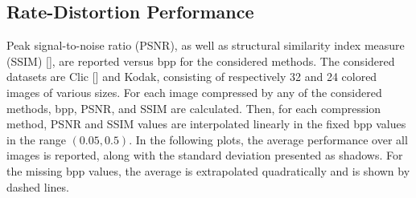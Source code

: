\subsection{Rate-Distortion Performance} \label{sec:rate_distortion_performance}
Peak signal-to-noise ratio (PSNR), as well as structural similarity index measure (SSIM) [], are reported versus bpp for the considered methods. 
The considered datasets are Clic [] and Kodak, consisting of respectively 32 and 24 colored images of various sizes.
For each image compressed by any of the considered methods, bpp, PSNR, and SSIM are calculated. 
Then, for each compression method, PSNR and SSIM values are interpolated linearly in the fixed bpp values in the range $(0.05, 0.5)$. 
In the following plots, the average performance over all images is reported, along with the standard deviation presented as shadows.
For the missing bpp values, the average is extrapolated quadratically and is shown by dashed lines.

